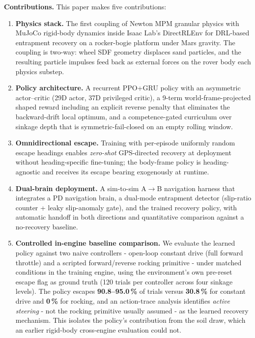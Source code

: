\documentclass[conference]{IEEEtran}
\begin{document}
\textbf{Contributions.} This paper makes five contributions:
\begin{enumerate}
  \item \textbf{Physics stack.} The first coupling of Newton MPM granular
        physics with MuJoCo rigid-body dynamics inside Isaac Lab's
        DirectRLEnv for DRL-based entrapment recovery on a rocker-bogie
        platform under Mars gravity. The coupling is two-way: wheel SDF
        geometry displaces sand particles, and the resulting particle impulses
        feed back as external forces on the rover body each physics substep.
  \item \textbf{Policy architecture.} A recurrent PPO+GRU policy with an
        asymmetric actor--critic (29D actor, 37D privileged critic), a
        9-term world-frame-projected shaped reward including an explicit
        reverse penalty that eliminates the backward-drift local optimum, and
        a competence-gated curriculum over sinkage depth that is
        symmetric-fail-closed on an empty rolling window.
  \item \textbf{Omnidirectional escape.} Training with per-episode uniformly
        random escape headings enables \emph{zero-shot} GPS-directed recovery
        at deployment without heading-specific fine-tuning; the body-frame
        policy is heading-agnostic and receives its escape bearing exogenously
        at runtime.
  \item \textbf{Dual-brain deployment.} A sim-to-sim A$\to$B navigation harness
        that integrates a PD navigation brain, a dual-mode entrapment
        detector (slip-ratio counter + leaky slip-anomaly gate), and
        the trained recovery policy, with automatic handoff in both
        directions and quantitative comparison against a no-recovery
        baseline.
  \item \textbf{Controlled in-engine baseline comparison.} We evaluate the
        learned policy against two naive controllers - open-loop constant drive
        (full forward throttle) and a scripted forward/reverse rocking
        primitive - under matched conditions in the training engine, using the
        environment's own pre-reset escape flag as ground truth (120 trials per
        controller across four sinkage levels). The policy escapes
        \textbf{90.8--95.0\,\%} of trials versus \textbf{30.8\,\%} for constant
        drive and \textbf{0\,\%} for rocking, and an action-trace analysis
        identifies \emph{active steering} - not the rocking primitive usually
        assumed - as the learned recovery mechanism. This isolates the policy's
        contribution from the soil draw, which an earlier rigid-body
        cross-engine evaluation could not.
\end{enumerate}
\end{document}
